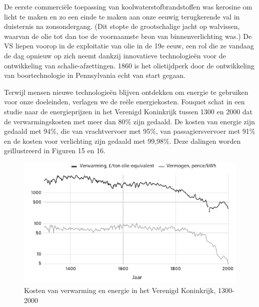 \begin{blockquotebox}
    \par\vspace{1em}\noindent
    De eerste commerciële toepassing van koolwaterstofbrandstoffen was kerosine om licht te maken en zo een einde te maken aan onze eeuwig terugkerende val in duisternis na zonsondergang. (Dit stopte de grootschalige jacht op walvissen, waarvan de olie tot dan toe de voornaamste bron van binnenverlichting was.) De VS liepen voorop in de exploitatie van olie in de 19e eeuw, een rol die ze vandaag de dag opnieuw op zich neemt dankzij innovatieve technologieën voor de ontwikkeling van schalie-afzettingen. 1860 is het olietijdperk door de ontwikkeling van boortechnologie in Pennsylvania echt van start gegaan.\footnotemark
\end{blockquotebox}

Terwijl mensen nieuwe technologieën blijven ontdekken om energie te gebruiken voor onze doeleinden, verlagen we de reële energiekosten. Fouquet schat in een studie naar de energieprijzen in het Verenigd Koninkrijk tussen 1300 en 2000 dat de verwarmingskosten met meer dan 80\% zijn gedaald. De kosten van energie zijn gedaald met 94\%, die van  vrachtvervoer met 95\%, van passagiersvervoer met 91\% en de kosten voor verlichting zijn gedaald met 99,98\%. Deze dalingen worden geïllustreerd in Figuren 15 en 16.\autocite{104}

\begin{figure}[!htb]
\centering
    \includegraphics[width=\textwidth]{figures/fig15.pdf}
    \caption[Kosten van verwarming en energie in het Verenigd Koninkrijk, 1300-2000.]{Kosten van verwarming en energie in het Verenigd Koninkrijk, 1300-2000}
    \label{fig15}
\end{figure}

